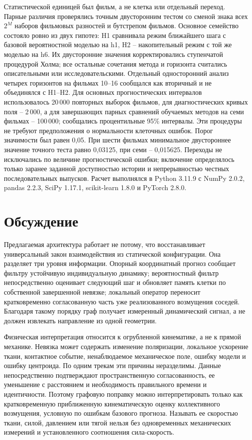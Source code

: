 \documentclass[11pt,a4paper]{article}
\begin{document}
Статистической единицей был фильм, а не клетка или отдельный переход. Парные различия проверялись точным двусторонним тестом со сменой знака всех $2^M$ наборов фильмовых разностей и бутстрепом фильмов. Основное семейство состояло ровно из двух гипотез: H1 сравнивала режим ближайшего шага с базовой вероятностной моделью на h1, H2 -- накопительный режим с той же моделью на h6. Их двусторонние значения корректировались ступенчатой процедурой Холма; все остальные сочетания метода и горизонта считались описательными или исследовательскими. Отдельный односторонний анализ четырех горизонтов на фильмах 10--16 сообщался как вторичный и не объединялся с H1--H2. Для основных прогностических интервалов использовалось 20\,000 повторных выборок фильмов, для диагностических кривых поля -- 2\,000, а для завершающих парных сравнений обучаемых методов на семи фильмах -- 100\,000; сообщались процентильные 95\% интервалы. Эти процедуры не требуют предположения о нормальности клеточных ошибок. Порог значимости был равен 0,05. При шести фильмах минимальное двустороннее значение точного теста равно 0,03125, при семи -- 0,015625. Переходы не исключались по величине прогностической ошибки; включение определялось только заранее заданной доступностью истории и непрерывностью честных последовательных выпусков. Расчет выполнялся в Python 3.11.9 с NumPy 2.0.2, pandas 2.2.3, SciPy 1.17.1, scikit-learn 1.8.0 и PyTorch 2.8.0.

\section{Обсуждение}
Предлагаемая архитектура работает не потому, что восстанавливает универсальный закон взаимодействия из статической конфигурации. Она разделяет три уровня информации. Опорный координатный прогноз сообщает фильтру устойчивую индивидуальную динамику; вероятностный фильтр непосредственно оценивает следующий шаг и обновляет память клетки по собственной завершенной невязке; локальный оператор переносит кратковременно согласованную часть уже реализованного возмущения соседей. Благодаря такому порядку граф получает измеренный динамический сигнал, а не должен извлекать направление из одной геометрии.

Физическая интерпретация относится к огрубленной кинематике, а не к прямой механике. Невязка может содержать изменение поляризации, локальное ускорение ткани, контактное событие, ненаблюдаемое механическое поле, ошибку модели и ошибку центроида. По одним трекам эти причины неразделимы. Данные непосредственно подтверждают пространственную согласованность, ее уменьшение с расстоянием и необходимость правильного времени и идентичности. Поэтому графовую поправку можно интерпретировать только как кратковременную приближенную кинематическую оценку коллективного возмущения, условную по ошибкам базового прогноза. Называть ее скоростью ткани, силой, давлением или тягой нельзя без одновременных механических измерений и установленного соотношения сила-скорость.
\end{document}
